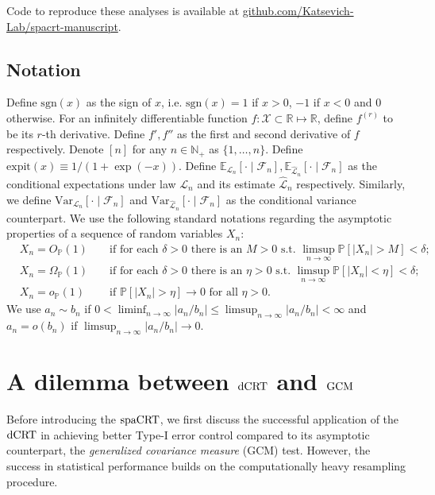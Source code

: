 \documentclass[12pt]{article}
\theoremstyle{definition}
\def\P{\mathbb{P}}
\def\sgn{\mathrm{sgn}}
\def\P{\mathbb{P}}
\newcommand{\E}{\mathbb E}								%
\newcommand{\V}{\mathrm{Var}}							%
\renewcommand{\P}{\mathbb{P}}							%
\newcommand{\expit}{\mathrm{expit}}                 	%
\newcommand{\law}{\mathcal L}							%
\newcommand{\lawhat}{\widehat{\mathcal L}}				%
\newcommand{\dCRT}{\textnormal{dCRT}} 					%
\newcommand{\GCM}{\textnormal{GCM}}						%
\newcommand{\spacrt}{\textnormal{spaCRT}}               %
\begin{document}
Code to reproduce these analyses is available at \href{https://github.com/Katsevich-Lab/spacrt-manuscript}{github.com/Katsevich-Lab/spacrt-manuscript}. 

\subsection{Notation}


Define $\sgn(x)$ as the sign of $x$, i.e. $\sgn(x)=1$ if $x>0$, $-1$ if $x<0$ and $0$ otherwise. For an infinitely differentiable function $f:\mathcal{X}\subset\mathbb{R}\mapsto\mathbb{R}$, define $f^{(r)}$ to be its $r$-th derivative. Define $f',f''$ as the first and second derivative of $f$ respectively. Denote $[n]$ for any $n\in\mathbb{N}_+$ as $\{1,\ldots,n\}$. Define $\expit(x)\equiv 1/ (1+\exp(-x))$. Define $\E_{\law_n}[\cdot\mid\mathcal{F}_n],\E_{\lawhat_n}[\cdot\mid\mathcal{F}_n]$ as the conditional expectations under law $\law_n$ and its estimate $\lawhat_n$ respectively. Similarly, we define $\V_{\law_n}[\cdot\mid\mathcal{F}_n]$ and $\V_{\lawhat_n}[\cdot\mid\mathcal{F}_n]$ as the conditional variance counterpart. We use the following standard notations regarding the asymptotic properties of a sequence of random variables $X_n$:
\begin{align*}
  &X_n = O_{\P}(1) &&\text{ if for each } \delta > 0 \text{ there is an } M > 0 \text{ s.t. } \limsup_{n \rightarrow \infty}\P[|X_n| > M] < \delta; \\
  &X_n = \Omega_{\P}(1) &&\text{ if for each } \delta > 0 \text{ there is an } \eta > 0 \text{ s.t. } \limsup_{n \rightarrow \infty}\P[|X_n| < \eta] < \delta;\\
  &X_n = o_{\P}(1) &&\text{ if } \P[|X_n| > \eta] \rightarrow 0 \text{ for all } \eta > 0.
\end{align*}
We use $a_n\sim b_n$ if $0<\liminf_{n\rightarrow\infty}|a_n/b_n|\leq\limsup_{n\rightarrow\infty}|a_n/b_n|<\infty$ and $a_n=o(b_n)$ if $\limsup_{n\rightarrow\infty}|a_n/b_n|\rightarrow0$. 

\section{A dilemma between $\dCRT$ and $\GCM$}\label{sec:finite_sample}

Before introducing the $\spacrt$, we first discuss the successful application of the $\dCRT$ in achieving better Type-I error control compared to its asymptotic counterpart, the \textit{generalized covariance measure} (GCM) test. However, the success in statistical performance builds on the computationally heavy resampling procedure. 
\end{document}
